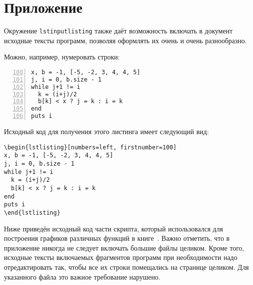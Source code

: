 \section{Приложение}

Окружение \verb|lstinputlisting| также даёт возможность включать в документ
исходные тексты программ, позволяя оформлять их очень и очень разнообразно. 

Можно, например, нумеровать строки:

\begin{lstlisting}[numbers=left, firstnumber=100]
x, b = -1, [-5, -2, 3, 4, 4, 5]
j, i = 0, b.size - 1
while j+1 != i
  k = (i+j)/2
  b[k] < x ? j = k : i = k
end
puts i
\end{lstlisting}

Исходный код для получения этого листинга имеет следующий вид:

\begin{small}
\begin{verbatim}
\begin{lstlisting}[numbers=left, firstnumber=100]
x, b = -1, [-5, -2, 3, 4, 4, 5]
j, i = 0, b.size - 1
while j+1 != i
  k = (i+j)/2
  b[k] < x ? j = k : i = k
end
puts i
\end{lstlisting}
\end{verbatim}
\end{small}

Ниже приведён исходный код части скрипта, который использовался для построения
графиков различных функций в книге~\cite{roganov-jurists}. Важно отметить, что
в приложение никогда не следует включать большие файлы целиком. Кроме того, 
исходные тексты включаемых фрагментов программ при необходимости надо 
отредактировать так, чтобы все их строки помещались на странице целиком. Для
указанного файла это важное требование нарушено.




